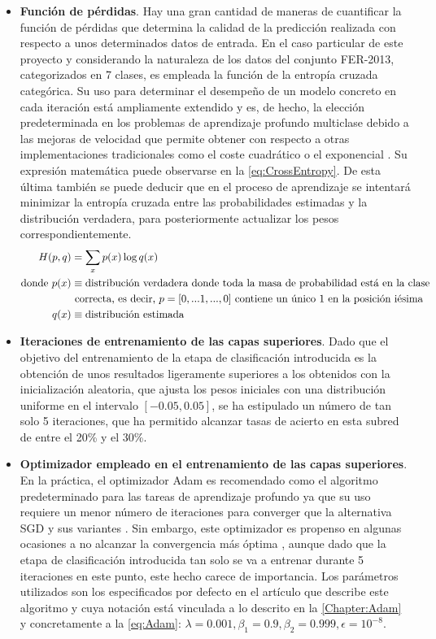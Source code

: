 \begin{itemize}
    \item \textbf{Función de pérdidas}. Hay una gran cantidad de maneras de cuantificar la función de pérdidas que determina la calidad de la predicción realizada con respecto a unos determinados datos de entrada. En el caso particular de este proyecto y considerando la naturaleza de los datos del conjunto FER-2013, categorizados en 7 clases, es empleada la función de la entropía cruzada categórica. Su uso para determinar el desempeño de un modelo concreto en cada iteración está ampliamente extendido y es, de hecho, la elección predeterminada en los problemas de aprendizaje profundo multiclase debido a las mejoras de velocidad que permite obtener con respecto a otras implementaciones tradicionales como el coste cuadrático o el exponencial \cite{CrossEntropy}. Su expresión matemática puede observarse en la \autoref{eq:CrossEntropy}. De esta última también se puede deducir que en el proceso de aprendizaje se intentará minimizar la entropía cruzada entre las probabilidades estimadas y la distribución verdadera, para posteriormente actualizar los pesos correspondientemente.
    \begin{align} \label{eq:CrossEntropy}
        H(p, q) &= \sum\limits_{x} p(x) \log q(x) \\
        \text{donde}~ 
            p(x) &\equiv \text{distribución verdadera donde toda la masa de probabilidad está en la clase} \notag \\
               & \text{ correcta, es decir, $p = [0, ... 1, ..., 0]$ contiene un único $1$ en la posición iésima} \notag \\
            q(x) & \equiv \text{distribución estimada} \notag
    \end{align}
    \item \textbf{Iteraciones de entrenamiento de las capas superiores}. Dado que el objetivo del entrenamiento de la etapa de clasificación introducida es la obtención de unos resultados ligeramente superiores a los obtenidos con la inicialización aleatoria, que ajusta los pesos iniciales con una distribución uniforme en el intervalo $[-0.05, 0.05]$, se ha estipulado un número de tan solo 5 iteraciones, que ha permitido alcanzar tasas de acierto en esta subred de entre el 20\% y el 30\%.
    \item \textbf{Optimizador empleado en el entrenamiento de las capas superiores}. En la práctica, el optimizador Adam es recomendado como el algoritmo predeterminado para las tareas de aprendizaje profundo ya que su uso requiere un menor número de iteraciones para converger que la alternativa SGD y sus variantes \cite{CS231n}. Sin embargo, este optimizador es propenso en algunas ocasiones a no alcanzar la convergencia más óptima \cite{AdamToSDG}, aunque dado que la etapa de clasificación introducida tan solo se va a entrenar durante 5 iteraciones en este punto, este hecho carece de importancia. Los parámetros utilizados son los especificados por defecto en el artículo que describe este algoritmo \cite{Adam} y cuya notación está vinculada a lo descrito en la \autoref{Chapter:Adam} y concretamente a la \autoref{eq:Adam}: $\lambda = 0.001, \beta_1 = 0.9, \beta_2 = 0.999, \epsilon = 10^{-8}$.

\end{itemize}

